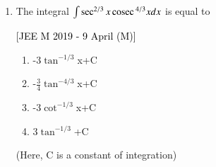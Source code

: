 \documentclass[journal,12pt,twocolumn]{IEEEtran}
\theoremstyle{remark}
\begin{document}
\begin{enumerate}[label=\textcolor{black}{\arabic*.}]
	\item The integral $\int \sec ^{2/3}x\,\text{cosec}\, ^{4/3}x dx$ is equal to

		\hfill{\textcolor{black}{[JEE M 2019 - 9 April (M)]}}

		\begin{multicols}{2}
			\begin{enumerate}[label=(\alph*)]
				\item -3$\tan ^{-1/3}$x+C
				\item -$\frac{3}{4}\tan ^{-4/3}$x+C
				\item -3$\cot ^{-1/3}$x+C
				\item 3$\tan ^{-1/3}$+C
			\end{enumerate}
		\end{multicols}
		(Here, C is a constant of integration)
\end{enumerate}
\bigskip
\bigskip
\end{document}
